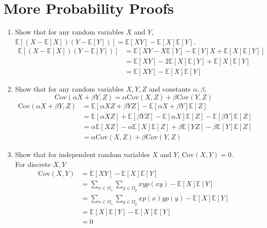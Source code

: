 \documentclass{article}
\begin{document}
\section{More Probability Proofs}
\begin{enumerate}[label=\arabic*.]
\item Show that for any random variables $X$ and $Y$, $\mathbb{E}[(X - \mathbb{E}[X])(Y - \mathbb{E}[Y])] = \mathbb{E}[XY] - \mathbb{E}[X]\mathbb{E}[Y]$.
	 {\color{blue} 
	 \begin{align*}
	 \mathbb{E}[(X - \mathbb{E}[X])(Y - \mathbb{E}[Y])] &= \mathbb{E}[XY - X\mathbb{E}[Y] - \mathbb{E}[Y]X + \mathbb{E}[X]\mathbb{E}[Y]] \\
	 &= \mathbb{E}[XY] - 2\mathbb{E}[X]\mathbb{E}[Y] + \mathbb{E}[X]\mathbb{E}[Y] \\
	 &= \mathbb{E}[XY] - \mathbb{E}[X]\mathbb{E}[Y]
	 \end{align*}
	 }
\item Show that for any random variables $X, Y, Z$ and constants $\alpha, \beta$, $$\text{Cov}(\alpha X + \beta Y, Z) = \alpha\text{Cov}(X, Z) + \beta\text{Cov}(Y, Z)$$
	 {\color{blue}
	 \begin{align*}
	 \text{Cov}(\alpha X + \beta Y, Z) &= \mathbb{E}[\alpha XZ + \beta YZ] - \mathbb{E}[\alpha X + \beta Y]\mathbb{E}[Z] \\
	 &= \mathbb{E}[\alpha XZ] + \mathbb{E}[\beta YZ] - \mathbb{E}[\alpha X]\mathbb{E}[Z] - \mathbb{E}[\beta Y]\mathbb{E}[Z] \\
	 &= \alpha\mathbb{E}[XZ] - \alpha\mathbb{E}[X]\mathbb{E}[Z] + \beta\mathbb{E}[YZ] - \beta\mathbb{E}[Y]\mathbb{E}[Z] \\
	 &= \alpha\text{Cov}(X, Z) + \beta\text{Cov}(Y, Z)
	 \end{align*}
	 }
\item Show that for independent random variables $X$ and $Y$, $\text{Cov}(X, Y) = 0$. \\
	 {\color{blue} For discrete $X, Y$
	 \begin{align*}
	 \text{Cov}(X, Y) &= \mathbb{E}[XY] - \mathbb{E}[X]\mathbb{E}[Y] \\
	 &= \sum_{x \in \Omega_x}\sum_{y \in \Omega_y} xyp(xy) - \mathbb{E}[X]\mathbb{E}[Y] \\
	 &= \sum_{x \in \Omega_x}\sum_{y \in \Omega_y}xp(x)yp(y) - \mathbb{E}[X]\mathbb{E}[Y] \\
	 &= \mathbb{E}[X]\mathbb{E}[Y] - \mathbb{E}[X]\mathbb{E}[Y] \\
	 &= 0
	 \end{align*}
}
\end{enumerate}
\end{document}
